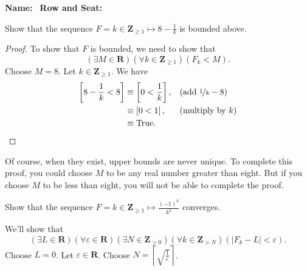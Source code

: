 \documentclass[12pt, fleqn, answers]{exam}
\newcommand{\reals}{\mathbf{R}}
\newcommand{\integers}{\mathbf{Z}}
\newcommand{\True}{\mathrm{True}}
\begin{document}
\large
\vspace{0.1in}
\noindent{}
{\bf Name:}\hrulefill\
\noindent {}
{\bf Row and Seat:}\hrulefill\

\vspace{0.1in}

\small
\normalsize
\begin{questions}

\question Show that the sequence $F = k \in \integers_{\geq 1} \mapsto 8 - \frac{1}{k}$ is
bounded above.
\begin{solution} 
  \begin{proof}
  To show that $F$ is bounded, we need to show that 
  \begin{equation*}
     \left(\exists M \in \reals\right)
     \left(\forall k \in \integers_{\geq 1} \right)
     \left(F_k < M\right).
  \end{equation*}
  Choose $M = 8$. Let $k \in \integers_{\geq 1} $. We have
\begin{align*}
 \left[ 8 - \frac{1}{k} < 8 \right] &\equiv \left[  0 <  \frac{1}{k} \right], && \mbox{(add $ \nicefrac{1}{k} -8$)} \\
                                               & \equiv \left[  0 < 1 \right], && \mbox{(multiply by $k$)} \\
  &\equiv \True. &&\qedhere
\end{align*}
\end{proof}
Of course, when they exist, upper bounds are never unique. To complete
this proof, you could choose $M$ to be any real number greater than eight.
But if you choose $M$ to be less than eight, you will not be able to
complete the proof.
\end{solution}
\question Show that the sequence $F = k \in \integers_{\geq 1} \mapsto \frac{(-1)^k}{k^2}$ converges.
\begin{solution} We'll show that
\begin{equation*}
 \left(\exists L \in \reals \right)
 \left(\forall \varepsilon \in \reals\right)
 \left(\exists N \in \integers_{>0}\right)
 \left(\forall k \in \integers_{>N} \right)
 \left(|F_k - L | < \varepsilon\right).
\end{equation*}
Choose $L = 0$. Let  $\varepsilon \in \reals$. Choose $N =  \left \lceil 
\sqrt{\frac{1}{\varepsilon}} \right \rceil $. 

\end{solution}
\end{questions}
\end{document}
